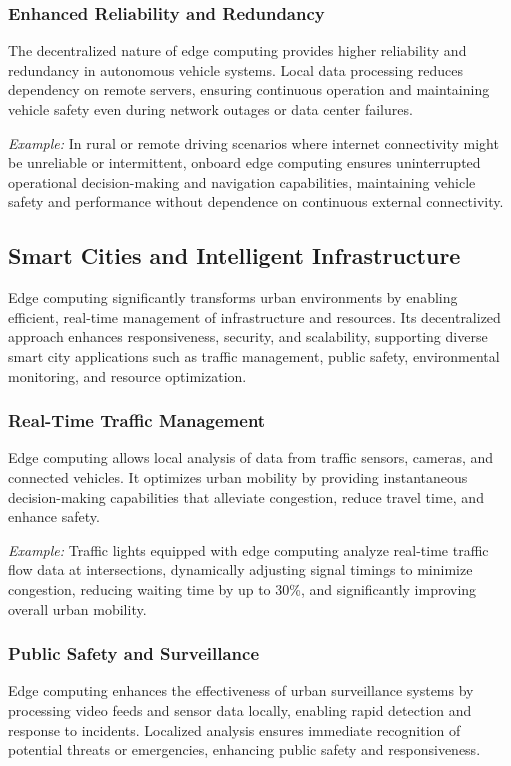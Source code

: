 \documentclass[runningheads]{llncs}
\begin{document}
\subsubsection{Enhanced Reliability and Redundancy}
The decentralized nature of edge computing provides higher reliability and redundancy in autonomous vehicle systems. Local data processing reduces dependency on remote servers, ensuring continuous operation and maintaining vehicle safety even during network outages or data center failures.

\noindent\textit{Example:} In rural or remote driving scenarios where internet connectivity might be unreliable or intermittent, onboard edge computing ensures uninterrupted operational decision-making and navigation capabilities, maintaining vehicle safety and performance without dependence on continuous external connectivity.

\subsection{Smart Cities and Intelligent Infrastructure}

Edge computing significantly transforms urban environments by enabling efficient, real-time management of infrastructure and resources. Its decentralized approach enhances responsiveness, security, and scalability, supporting diverse smart city applications such as traffic management, public safety, environmental monitoring, and resource optimization.

\subsubsection{Real-Time Traffic Management}
Edge computing allows local analysis of data from traffic sensors, cameras, and connected vehicles. It optimizes urban mobility by providing instantaneous decision-making capabilities that alleviate congestion, reduce travel time, and enhance safety.

\noindent\textit{Example:} Traffic lights equipped with edge computing analyze real-time traffic flow data at intersections, dynamically adjusting signal timings to minimize congestion, reducing waiting time by up to 30\%, and significantly improving overall urban mobility.

\subsubsection{Public Safety and Surveillance}
Edge computing enhances the effectiveness of urban surveillance systems by processing video feeds and sensor data locally, enabling rapid detection and response to incidents. Localized analysis ensures immediate recognition of potential threats or emergencies, enhancing public safety and responsiveness.
\end{document}
